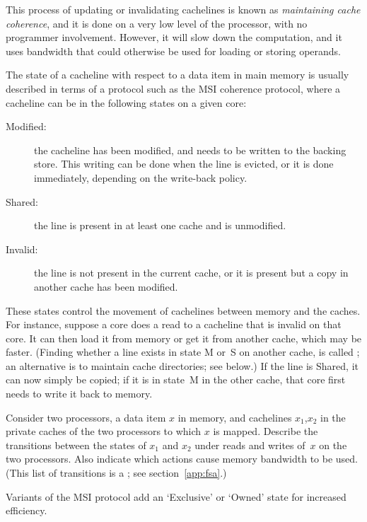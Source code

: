 This process of updating or invalidating cachelines
is known as \emph{maintaining cache coherence}, and it is done on
a very low level of the processor, with no programmer involvement.
However, it will slow down the computation, and it uses bandwidth
that could otherwise be used for loading or storing operands.

The state of a cacheline with respect to a data item in main memory
is usually described in terms of a protocol such as 
the \acf{MSI} coherence protocol, where a
cacheline can be in the following states on a given core:
\begin{description}
\item [Modified:] the cacheline has been modified, and needs to be
  written to the backing store. This writing can be done when the line
  is evicted, or it is done immediately, depending on the
  write-back policy.
\item [Shared:] the line is present in at least one cache and is unmodified.
\item [Invalid:] the line is not present in the current cache, or it
  is present but a copy in another cache has been modified.
\end{description}

These states control the movement of cachelines between memory and the
caches. For instance, suppose a core does a read to a cacheline that
is invalid on that core. It can then load it from memory or get it
from another cache, which may be faster.
(Finding whether a line exists
in state M or~S on another cache,
is called ; an alternative
  is to maintain cache directories; see below.)
If the line is Shared, it can now simply be copied; if it is in state~M in
the other cache, that core first needs to write it back to memory.

\begin{exercise}
  Consider two processors, a data item $x$ in memory, and cachelines
  $x_1$,$x_2$ in the private caches of the two processors to which $x$
  is mapped. Describe the transitions between the states of $x_1$ and
  $x_2$ under reads and writes of~$x$ on the two processors. Also
  indicate which actions cause memory bandwidth to be used.
    (This list
    of transitions is a ; see section~\ref{app:fsa}.)
\end{exercise}

Variants of the \ac{MSI} protocol add an `Exclusive' or `Owned' state
for increased efficiency.

